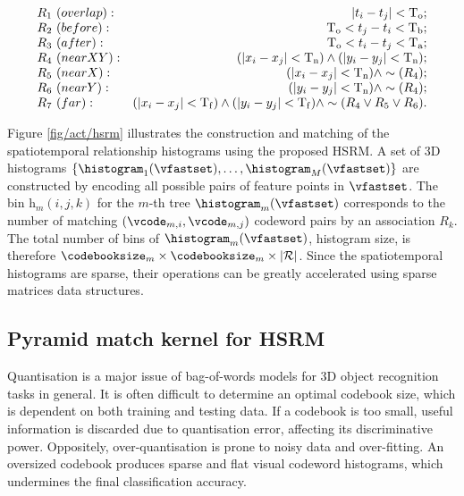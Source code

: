 \begin{equation}
	\centering 
	\begin{array}{lr}
		R_{1}~{(overlap)}: & |t_i - t_j| < \mathrm{T_{o}}; \\
		R_{2}~{(before)}: & \mathrm{T_{o}} < t_j - t_i < \mathrm{T_{b}}; \\
		R_{3}~{(after)}: & \mathrm{T_{o}} < t_i - t_j < \mathrm{T_{a}}; \\
		R_{4}~{(near XY)}: & (|x_i - x_j| < \mathrm{T_{n}}) \wedge (|y_i - y_j| < \mathrm{T_{n}}); \\
		R_{5}~{(near X)}: & (|x_i - x_j| < \mathrm{T_{n}}) \wedge \sim(R_{4}); \\
		R_{6}~{(near Y)}: & (|y_i - y_j| < \mathrm{T_{n}}) \wedge \sim(R_{4}); \\
		R_{7}~{(far)}: & (|x_i - x_j| < \mathrm{T_{f}}) \wedge (|y_i - y_j| < \mathrm{T_{f}}) \wedge \sim(R_{4} \vee R_{5} \vee R_{6}).
	\end{array}
\end{equation}

Figure \ref{fig/act/hsrm} illustrates the construction and matching of the spatiotemporal relationship histograms using the proposed HSRM. 
A set of 3D histograms $\{ \histogram_1(\vfastset),\dots,\histogram_{M}(\vfastset)\}$ are constructed by encoding all possible pairs of feature points in $\vfastset$. The bin $\mathrm{h}_{m}(i,j,k)$ for the $m$-th tree $\histogram_{m}(\vfastset)$ corresponds to the number of matching $(\vcode_{m,i},\vcode_{m,j})$ codeword pairs by an association $R_k$. The total number of bins of $\histogram_m(\vfastset)$, \ie histogram size, is therefore $\codebooksize_m \times \codebooksize_m \times |\mathcal{R}|$. Since the spatiotemporal histograms are sparse, their operations can be greatly accelerated using sparse matrices data structures.  

\subsection{Pyramid match kernel for HSRM}
Quantisation is a major issue of bag-of-words models for 3D object recognition tasks in general. It is often difficult to determine an optimal codebook size, which is dependent on both training and testing data. 
If a codebook is too small, useful information is discarded due to quantisation error, affecting its discriminative power. 
Oppositely, over-quantisation is prone to noisy data and over-fitting. An oversized codebook produces sparse and flat visual codeword histograms, which undermines the final classification accuracy.  

